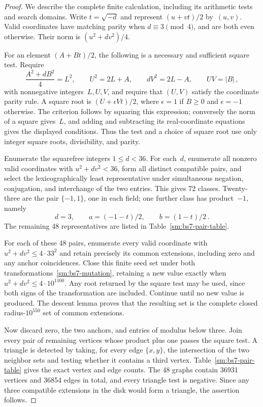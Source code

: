 \documentclass[12pt]{article}
\numberwithin{equation}{section}
\begin{document}
\begin{proof}
We describe the complete finite calculation, including its arithmetic tests and search domains. Write $t=\sqrt{-d}$ and represent $(u+vt)/2$ by~$(u,v)$. Valid coordinates have matching parity when $d\equiv3\pmod4$, and are both even otherwise. Their norm is $(u^2+dv^2)/4$.

For an element $(A+Bt)/2$, the following is a necessary and sufficient square test. Require
\begin{equation*}
 \frac{A^2+dB^2}{4}=L^2,\qquad
 U^2=2L+A,\qquad dV^2=2L-A,\qquad UV=|B|\,,
\end{equation*}
with nonnegative integers~$L,U,V$, and require that $(U,V)$ satisfy the coordinate parity rule. A square root is $(U+\epsilon Vt)/2$, where $\epsilon=1$ if $B\ge0$ and $\epsilon=-1$ otherwise. The criterion follows by squaring this expression; conversely the norm of a square gives~$L$, and adding and subtracting its real-coordinate equations gives the displayed conditions. Thus the test and a choice of square root use only integer square roots, divisibility, and parity.

Enumerate the squarefree integers $1\le d<36$. For each~$d$, enumerate all nonzero valid coordinates with $u^2+dv^2<36$, form all distinct compatible pairs, and select the lexicographically least representative under simultaneous negation, conjugation, and interchange of the two entries. This gives 72 classes. Twenty-three are the pair $\{-1,1\}$, one in each field; one further class has product~$-1$, namely
\begin{equation}\label{sm:bs7-exceptional-pair}
 d=3,\qquad a=(-1-t)/2,\qquad b=(1-t)/2\,.
\end{equation}
The remaining 48 representatives are listed in Table~\ref{sm:bs7-pair-table}.

For each of these 48 pairs, enumerate every valid coordinate with $u^2+dv^2\le4\cdot33^2$ and retain precisely its common extensions, including zero and any anchor coincidences. Close this finite seed set under both transformations~\eqref{sm:bs7-mutation}, retaining a new value exactly when $u^2+dv^2\le4\cdot10^{1100}$. Any root returned by the square test may be used, since both signs of the transformation are included. Continue until no new value is produced. The descent lemma proves that the resulting set is the complete closed radius-$10^{550}$ set of common extensions.

Now discard zero, the two anchors, and entries of modulus below three. Join every pair of remaining vertices whose product plus one passes the square test. A triangle is detected by taking, for every edge $\{x,y\}$, the intersection of the two neighbor sets and testing whether it contains a third vertex. Table~\ref{sm:bs7-pair-table} gives the exact vertex and edge counts. The 48 graphs contain 36931 vertices and 36854 edges in total, and every triangle test is negative. Since any three compatible extensions in the disk would form a triangle, the assertion follows.
\end{proof}
\end{document}
